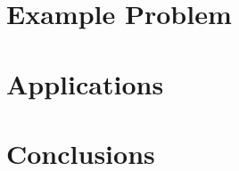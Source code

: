 \documentclass[]{aiaa-tc} %
\begin{document}
    
\section{Example Problem}

\section{Applications}

\section{Conclusions}


\end{document}
